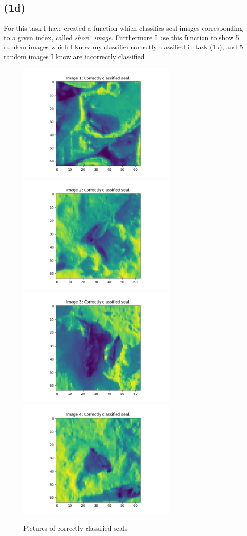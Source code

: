 \documentclass[12pt, letterpaper]{article}
\begin{document}
    \subsection*{(1d)}
      For this task I have created a function which classifies seal images corresponding to a given index, called \textit{show\_image}. Furthermore I use this function to show 5 random images which I know my classifier correctly classified in task (1b), and 5 random images I know are incorrectly classified.
      \begin{figure}[H]
        \caption{Pictures of correctly classified seals}
        \centering
        \includegraphics[width=8cm]{corr1}
        \includegraphics[width=8cm]{corr2}
        \includegraphics[width=8cm]{corr3}
        \includegraphics[width=8cm]{corr4}

\end{figure}
\end{document}
